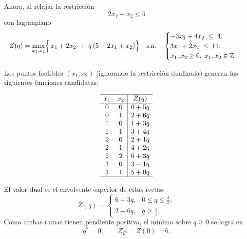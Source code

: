 \begin{enumerate}
Ahora, al relajar la restricción
    \[
      2x_{1} - x_{2} \le 5
    \]
    con lagrangiano
    \[
      Z(q)
      = \max_{x_{1},x_{2}}
      \Bigl\{\,x_{1} + 2x_{2}
      \;+\; q\,(5 - 2x_{1} + x_{2})\Bigr\}
      \quad\text{s.a.}\quad
      \begin{cases}
        -3x_{1} + 4x_{2} \;\le\; 4,\\
        3x_{1} + 2x_{2} \;\le\; 11,\\
        x_{1},x_{2}\ge0,\;x_{1},x_{2}\in\mathbb{Z}.
      \end{cases}
    \]

    Los puntos factibles \((x_{1},x_{2})\) (ignorando la restricción dualizada) generan las siguientes funciones candidatas:

    \[
      \begin{array}{cc|c}
      \hline
      x_{1} & x_{2} & \overline{Z}(q) \\ \hline
      0 & 0 & 0 + 5q \\
      0 & 1 &  2 + 6q \\
      1 & 0 & 1 + 3q \\
      1 & 1 & 3 + 4q \\
      2 & 0 & 2 + 1q \\
      2 & 1 & 4 + 2q \\
      2 & 2 & 6 + 3q \\
      3 & 0 & 3 - 1q \\
      3 & 1 & 5 + 0q \\ \hline
      \end{array}
    \]

    El valor dual es el envolvente superior de estas rectas:
    \[
      Z(q)
      =
      \begin{cases}
        6 + 3q, & 0 \le q \le \tfrac{4}{3},\\[0.3em]
        2 + 6q, & q \ge \tfrac{4}{3}.
      \end{cases}
    \]
    Como ambas ramas tienen pendiente positiva, el mínimo sobre \(q\ge0\) se logra en
    \[
      q^* = 0,
      \qquad
      Z_{D} = Z(0) = 6.
    \]
\end{enumerate}

